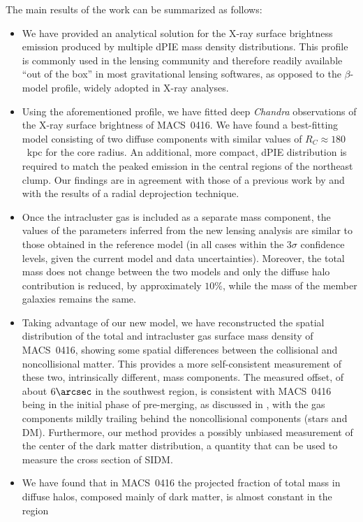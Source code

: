 \documentclass[twocolumn]{aastex61}
\begin{document}
The main results of the work can be summarized as follows:
\begin{itemize}
\item We have provided an analytical solution for the X-ray surface brightness
emission produced by multiple dPIE mass density distributions.
This profile is commonly used in the lensing community and therefore readily
available ``out of the box'' in most gravitational lensing softwares, as opposed
to the $\beta$-model profile, widely adopted in X-ray analyses.
\item Using the aforementioned profile, we have fitted deep \emph{Chandra} observations of
the X-ray surface brightness of MACS~0416.
We have found a best-fitting model consisting of two diffuse components with similar
values of $R_C \approx 180$~kpc for the core radius.
An additional, more compact, dPIE distribution is required to match the peaked
emission in the central regions of the northeast clump.
Our findings are in agreement with those of a previous work by \citet{Ogrean2015}
and with the results of a radial deprojection technique.
\item Once the intracluster gas is included as a separate mass component, the values
of the parameters inferred from the new lensing analysis are similar to those
obtained in the reference model (in all cases within the $3\sigma$
confidence levels, given the current model and data uncertainties).
Moreover, the total mass does not change between the two models and only the
diffuse halo contribution is reduced, by approximately $10\%$, while the mass
of the member galaxies remains the same.
\item Taking advantage of our new model, we have reconstructed the spatial distribution of
the total and intracluster gas surface mass density of MACS~0416, showing some
spatial differences between the collisional and noncollisional matter.
This provides a more self-consistent measurement of these two, intrinsically different,
mass components.
The measured offset, of about $6\arcsec$ in the southwest region, is consistent
with MACS~0416 being in the initial phase of pre-merging, as discussed in
\citet{Balestra2016}, with the gas components mildly trailing behind the
noncollisional components (stars and DM).
Furthermore, our method provides a possibly unbiased measurement of the center of
the dark matter distribution, a quantity that can be used to measure the cross
section of SIDM.
\item We have found that in MACS~0416 the projected fraction of total mass in
diffuse halos, composed mainly of dark matter, is almost constant in the region

\end{itemize}
\end{document}
